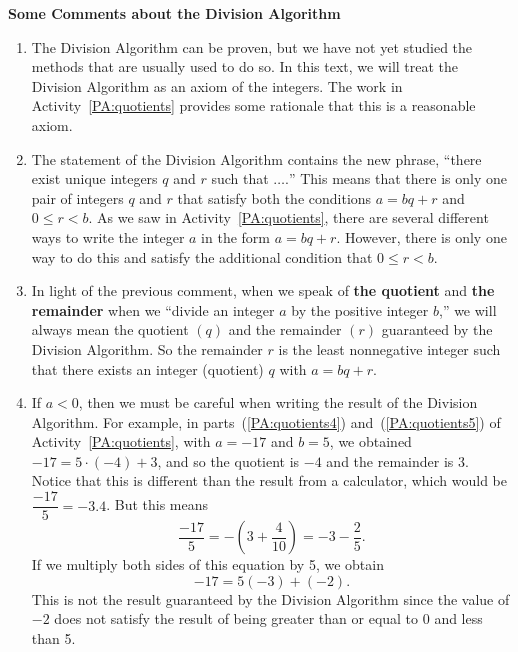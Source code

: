 \noindent
\textbf{Some Comments about the Division Algorithm}
\begin{enumerate}
\item The Division Algorithm can be proven, but we have not yet studied the methods that are usually used to do so.  In this text, we will treat the Division Algorithm as an axiom of the integers.  The work in  \typeu Activity~\ref*{PA:quotients} provides some rationale that this is a reasonable axiom.

\item The statement of the Division Algorithm contains the new phrase, ``there exist unique integers $q$  and  $r$  such that $ \ldots .$''   This means that there is only one pair of integers  $q$  and  $r$  that satisfy both the conditions  $a = bq + r$ and 
$0 \leq r < b$.  As we saw in \typeu Activity~\ref*{PA:quotients}, there are several different ways to write the integer  $a$  in the form  $a = bq + r$.  However, there is only one way to do this and satisfy the additional condition that  $0 \leq r < b$.

\item In light of the previous comment, when we speak of \textbf{the quotient}
%
 and \textbf{the remainder}
%
 when we ``divide an integer  $a$  by the positive integer  $b$,'' we will always mean the quotient $\left( q \right)$  and the remainder  $\left( r \right)$ guaranteed by the Division Algorithm.  So the remainder $r$ is the least nonnegative integer such that there exists an integer (quotient) $q$ with $a = bq + r$.

\item If  $a < 0$, then we must be careful when writing the result of the Division Algorithm.  For example, in parts~(\ref{PA:quotients4}) and~(\ref{PA:quotients5}) of \typeu Activity~\ref*{PA:quotients}, with $a =  - 17$  and  
$b = 5$, we obtained $-17 = 5\cdot(-4) + 3$, and so the quotient is $-4$ and the remainder is 3.  Notice that this is different than the result from a calculator, which would be $\dfrac{{ - 17}}{5} =  - 3.4$.  But this means
\[
\frac{{ - 17}}{5} =  - \left( {3 + \frac{4}{{10}}} \right) =  - 3 - \frac{2}{5}.
\]
If we multiply both sides of this equation by 5, we obtain
\[
{-17} = 5\left( { - 3} \right) + \left( { - 2} \right).
\]
This is not the result guaranteed by the Division Algorithm since the value of $-2$ does not satisfy the result of being greater than or equal to 0 and less than 5.  



\end{enumerate}

